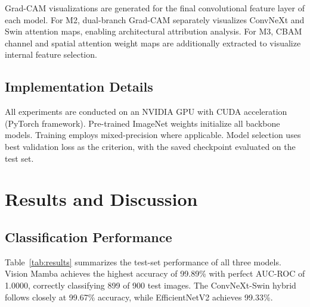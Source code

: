\documentclass[conference]{IEEEtran}
\begin{document}
Grad-CAM visualizations are generated for the 
final convolutional feature layer of each model. 
For M2, dual-branch Grad-CAM separately 
visualizes ConvNeXt and Swin attention maps, 
enabling architectural attribution analysis. 
For M3, CBAM channel and spatial attention 
weight maps are additionally extracted to 
visualize internal feature selection.

\subsection{Implementation Details}

All experiments are conducted on an NVIDIA GPU 
with CUDA acceleration (PyTorch framework). 
Pre-trained ImageNet weights initialize all 
backbone models. Training employs mixed-precision 
where applicable. Model selection uses best 
validation loss as the criterion, with the 
saved checkpoint evaluated on the test set.


\section{Results and Discussion}
\label{sec:results}

\subsection{Classification Performance}

Table~\ref{tab:results} summarizes the test-set 
performance of all three models. Vision Mamba 
achieves the highest accuracy of 99.89\% with 
perfect AUC-ROC of 1.0000, correctly classifying 
899 of 900 test images. The ConvNeXt-Swin hybrid 
follows closely at 99.67\% accuracy, while 
EfficientNetV2 achieves 99.33\%.

\begin{table}[htbp]
\caption{Comparative Classification Performance on ACRIMA Test Set}
\begin{center}
\label{tab:results}
\end{center}
\end{table}
\end{document}
